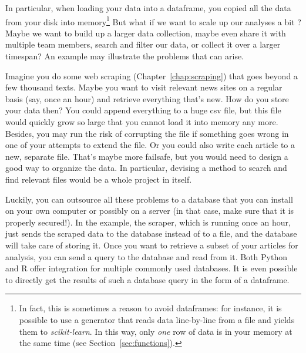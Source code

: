 In particular, when loading your data into a dataframe, you copied all
the data from your disk into memory\footnote{In fact, this is
  sometimes a reason to avoid dataframes: for instance, it is possible
  to use a generator that reads data line-by-line from a file and
  yields them to \emph{scikit-learn}. In this way, only \emph{one} row
  of data is in your memory at the same time (see Section~\ref{sec:functions}).}
But what if we want to scale up our analyses a bit
\cite[see][]{Trilling2018b}? Maybe we want to build up a larger
data collection, maybe even share it with multiple team members, search
and filter our data, or collect it over a larger timespan? An
example may illustrate the problems that can arise.

Imagine you do some web scraping (Chapter~\ref{chap:scraping}) that goes beyond
a few thousand texts. Maybe you want to visit relevant news sites on a
regular basis (say, once an hour) and retrieve everything that's
new. How do you store your data then? You could append everything to a
huge csv file, but this file would quickly grow so large that you
cannot load it into memory any more. Besides, you may run the risk of
corrupting the file if something goes wrong in one of your attempts to
extend the file. Or you could also write each article to a new, separate file.
That's maybe more failsafe, but you would need to design a good way
to organize the data. In particular, devising a method to search
and find relevant files would be a whole project in itself.

Luckily, you can outsource all these problems to a database that you can
install on your own computer or possibly on a server (in that case, make
sure that it is properly secured!). In the example, the scraper, which
is running once an hour, just sends the scraped data to the database
instead of to a file, and the database will take care of storing it.
Once you want to retrieve a subset of your articles for analysis,
you can send a query to the database and read from it. Both Python and
R offer integration for multiple commonly used databases. It is even
possible to directly get the results of such a database query in the
form of a dataframe.

